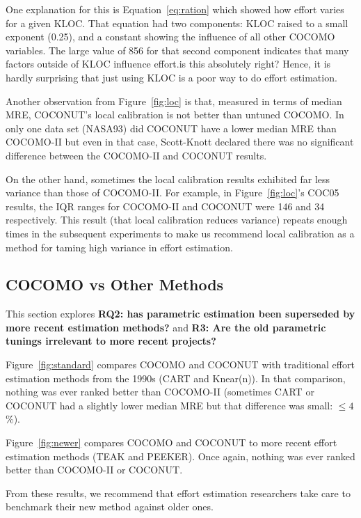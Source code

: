 \documentclass{sig-alternate}
\newcommand{\fig}[1]{Figure~\ref{fig:#1}}
\newcommand{\eq}[1]{Equation~\ref{eq:#1}}
\begin{document}
One explanation for this   is \eq{ration} which showed
how    effort   varies for a given KLOC. That equation had two components: KLOC raised to
a small exponent (0.25), and a constant showing the influence of all  other
COCOMO variables. The large value of 856 for that second component
indicates that many factors outside of KLOC influence effort.{is this absolutely right?} Hence, it is hardly
surprising that just using KLOC is a poor way to do effort estimation.

Another observation from \fig{loc} is that,
measured in terms of median MRE, COCONUT's local
calibration is not  better
than  untuned COCOMO. In only one data set
(NASA93) did COCONUT have a lower median MRE than
COCOMO-II but even in that case, Scott-Knott
declared there was no significant difference between
the COCOMO-II and COCONUT results.

On the other hand, sometimes the local calibration
results exhibited far less variance than those of
COCOMO-II. For example, in \fig{loc}'s COC05
results, the IQR ranges for
COCOMO-II and COCONUT were 146 and 34 respectively.
This result (that local calibration reduces
variance) repeats enough times in the subsequent
experiments to make us recommend local calibration
as a method for taming high variance in effort
estimation.




\subsection{COCOMO vs Other Methods}\label{sect:othermethods}
This section explores {\bf RQ2: 
has parametric estimation been superseded
by more recent estimation methods?}
and {\bf R3: Are the old parametric tunings irrelevant to
more recent projects?}

\fig{standard} compares COCOMO and COCONUT with  
traditional effort estimation methods
from the 1990s (CART and Knear(n)).
In that comparison, nothing was ever ranked better than COCOMO-II
(sometimes
CART or COCONUT had a slightly lower median MRE but that difference was small: $\le 4$\%).




\fig{newer} compares COCOMO and COCONUT to more recent effort estimation methods
  (TEAK and PEEKER). Once again,   nothing was ever ranked better than COCOMO-II
  or COCONUT.



From these results,
we recommend that effort estimation researchers take care to benchmark
their new method against older ones.
\end{document}
